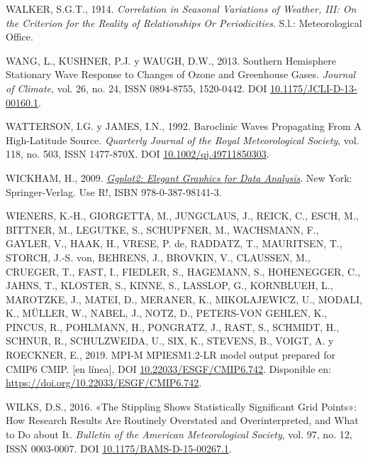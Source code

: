 \documentclass[12pt,oneside,a4paper]{reedthesis}
\newlength{\cslhangindent}
\newenvironment{CSLReferences}[2] %
 {%
  \setlength{\parindent}{0pt}
  \ifodd #1 \everypar{\setlength{\hangindent}{\cslhangindent}}\ignorespaces\fi
  \ifnum #2 > 0
  \setlength{\parskip}{#2\baselineskip}
  \fi
 }%
 {}
\begin{document}
\begin{CSLReferences}{1}{0}
\leavevmode{}%
WALKER, S.G.T., 1914. \emph{Correlation in {Seasonal Variations} of {Weather}, {III}: {On} the {Criterion} for the {Reality} of {Relationships Or Periodicities}}. S.l.: Meteorological Office.

\leavevmode{}%
WANG, L., KUSHNER, P.J. y WAUGH, D.W., 2013. Southern {Hemisphere Stationary Wave Response} to {Changes} of {Ozone} and {Greenhouse Gases}. \emph{Journal of Climate}, vol. 26, no. 24, ISSN 0894-8755, 1520-0442. DOI \href{https://doi.org/10.1175/JCLI-D-13-00160.1}{10.1175/JCLI-D-13-00160.1}.

\leavevmode{}%
WATTERSON, I.G. y JAMES, I.N., 1992. Baroclinic {Waves Propagating From A High-Latitude Source}. \emph{Quarterly Journal of the Royal Meteorological Society}, vol. 118, no. 503, ISSN 1477-870X. DOI \href{https://doi.org/10.1002/qj.49711850303}{10.1002/qj.49711850303}.

\leavevmode{}%
WICKHAM, H., 2009. \emph{\href{https://doi.org/10.1007/978-0-387-98141-3}{Ggplot2: {Elegant Graphics} for {Data Analysis}}}. New York: Springer-Verlag. Use {R}!, ISBN 978-0-387-98141-3.

\leavevmode{}%
WIENERS, K.-H., GIORGETTA, M., JUNGCLAUS, J., REICK, C., ESCH, M., BITTNER, M., LEGUTKE, S., SCHUPFNER, M., WACHSMANN, F., GAYLER, V., HAAK, H., VRESE, P. de, RADDATZ, T., MAURITSEN, T., STORCH, J.-S. von, BEHRENS, J., BROVKIN, V., CLAUSSEN, M., CRUEGER, T., FAST, I., FIEDLER, S., HAGEMANN, S., HOHENEGGER, C., JAHNS, T., KLOSTER, S., KINNE, S., LASSLOP, G., KORNBLUEH, L., MAROTZKE, J., MATEI, D., MERANER, K., MIKOLAJEWICZ, U., MODALI, K., MÜLLER, W., NABEL, J., NOTZ, D., PETERS-VON GEHLEN, K., PINCUS, R., POHLMANN, H., PONGRATZ, J., RAST, S., SCHMIDT, H., SCHNUR, R., SCHULZWEIDA, U., SIX, K., STEVENS, B., VOIGT, A. y ROECKNER, E., 2019. MPI-M MPIESM1.2-LR model output prepared for CMIP6 CMIP. {[}en línea{]}, DOI \href{https://doi.org/10.22033/ESGF/CMIP6.742}{10.22033/ESGF/CMIP6.742}. Disponible en: \url{https://doi.org/10.22033/ESGF/CMIP6.742}.

\leavevmode{}%
WILKS, D.S., 2016. {«{The Stippling Shows Statistically Significant Grid Points}»}: {How Research Results} Are {Routinely Overstated} and {Overinterpreted}, and {What} to {Do} about {It}. \emph{Bulletin of the American Meteorological Society}, vol. 97, no. 12, ISSN 0003-0007. DOI \href{https://doi.org/10.1175/BAMS-D-15-00267.1}{10.1175/BAMS-D-15-00267.1}.


\end{CSLReferences}
\end{document}
